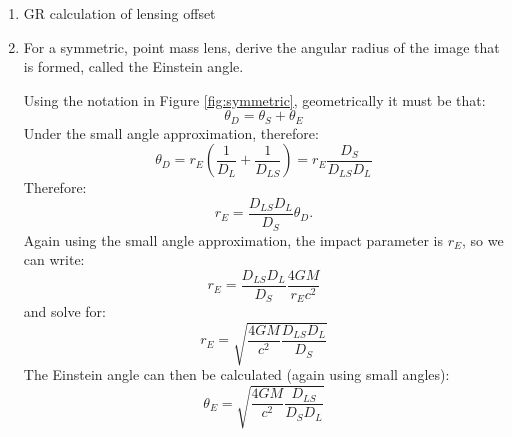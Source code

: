 \begin{enumerate}
\item GR calculation of lensing offset
\item For a symmetric, point mass lens, derive the angular radius of the image
    that is formed, called the Einstein angle.
\begin{answer}
Using the notation in Figure \ref{fig:symmetric}, geometrically it
must be that:
\begin{equation}
\theta_D = \theta_S + \theta_E
\end{equation}
Under the small angle approximation, therefore:
\begin{equation}
\theta_D = r_E \left(\frac{1}{D_L} + \frac{1}{D_{LS}}\right) =
r_E \frac{D_S}{D_{LS} D_L} 
\end{equation}
Therefore:
\begin{equation}
r_E = \frac{D_{LS} D_L}{D_S} \theta_D.
\end{equation}
Again using the small angle approximation, the impact parameter is
$r_E$, so we can write:
\begin{equation}
r_E = \frac{D_{LS} D_L}{D_S} \frac{4GM}{r_Ec^2}
\end{equation}
and solve for:
\begin{equation}
r_E = \sqrt{\frac{4GM}{c^2} \frac{D_{LS} D_L}{D_S}}
\end{equation}
The Einstein angle can then be calculated (again using small angles):
\begin{equation}
\theta_E = \sqrt{\frac{4GM}{c^2} \frac{D_{LS}}{D_S D_L}}
\end{equation}
\end{answer}


\end{enumerate}
